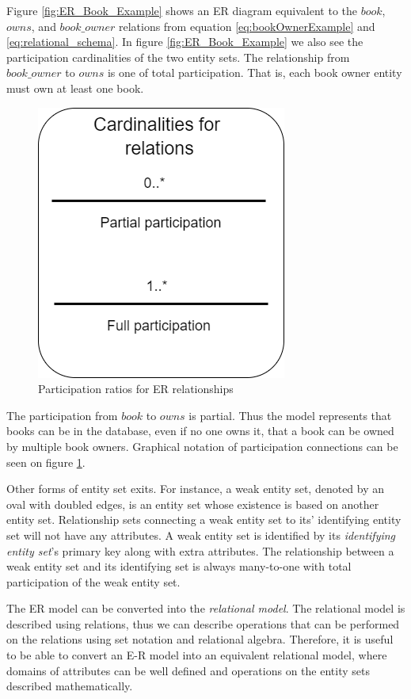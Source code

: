 Figure \ref{fig:ER_Book_Example} shows an ER diagram equivalent to the $book$, $owns$, and $book\_owner$ relations from equation \ref{eq:bookOwnerExample} and \ref{eq:relational_schema}.
In figure \ref{fig:ER_Book_Example} we also see the participation cardinalities of the two entity sets. 
The relationship from $book\_owner$ to $owns$ is one of total participation. That is, each book owner entity must own at least one book.
\begin{figure}[h]
    \centering
    \includegraphics[scale=0.5]{Images/cardinalities.png}
    \caption{Participation ratios for ER relationships}
    \label{fig:ERDiagram_Cardinality}
\end{figure}
The participation from $book$ to $owns$ is partial. Thus the model represents that books can be in the database, even if no one owns it, that a book can be owned by multiple book owners.
Graphical notation of participation connections can be seen on figure \ref{fig:ERDiagram_Cardinality}.


Other forms of entity set exits. For instance, a weak entity set, denoted by an oval with doubled edges, is an entity set whose existence is based on another entity set. Relationship sets connecting a weak entity set to its' identifying entity set will not have any attributes\cite{DBSBook}.
A weak entity set is identified by its \textit{identifying entity set}'s primary key along with extra attributes. 
The relationship between a weak entity set and its identifying set is always many-to-one with total participation of the weak entity set.

The ER model can be converted into the \textit{relational model}. The relational model is described using relations, thus we can describe operations that can be performed on the relations using set notation and relational algebra. 
Therefore, it is useful to be able to convert an E-R model into an equivalent relational model, where domains of attributes can be well defined and operations on the entity sets described mathematically.

